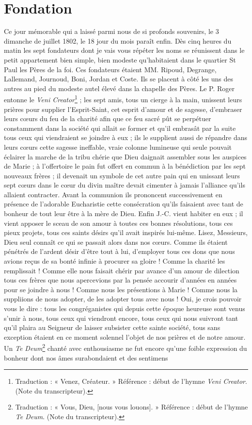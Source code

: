 \section*{Fondation}
Ce jour mémorable qui a laissé parmi nous de si profonds souvenirs, le 3 dimanche de juillet 1802, le 18 jour du mois paraît enfin. Dès cinq heures du matin les sept fondateurs dont je vais vous répéter les noms se réunissent dans le petit appartement bien simple, bien modeste qu'habitaient dans le quartier St Paul les Pères de la foi. Ces fondateurs étaient MM. Ripoud, Degrange, Lallemand, Journoud, Boni, Jordan et Coste. Ils se placent à côté les uns des autres au pied du modeste autel élevé dans la chapelle des Pères. Le P. Roger entonne le \textit{Veni Creator}\footnote{Traduction : « Venez, Créateur. » Référence : début de l’hymne \textit{Veni Creator}. (Note du transcripteur).} ; les sept amis, tous un cierge à la main, unissent leurs prières pour supplier l'Esprit-Saint, cet esprit d'amour et de sagesse, d'embraser leurs cœurs du feu de la charité afin que ce feu sacré pût se perpétuer constamment dans la société qui allait se former et qu'il embrasât par la suite tous ceux qui viendraient se joindre à eux ; ils le supplient aussi de répandre dans leurs cœurs cette sagesse ineffable, vraie colonne lumineuse qui seule pouvait éclairer la marche de la tribu chérie que Dieu daignait assembler sous les auspices de Marie ; à l'offertoire le pain fut offert en commun à la bénédiction par les sept nouveaux frères ; il devenait un symbole de cet autre pain qui en unissant
leurs sept cœurs dans le cœur du divin maître devait cimenter à jamais l'alliance qu'ils allaient contracter. Avant la communion ils prononcent successivement en présence de l'adorable Eucharistie cette consécration qu'ils faisaient avec tant de bonheur de tout leur être à la mère de Dieu. Enfin J.-C. vient habiter en eux ; il vient apposer le sceau de son amour à toutes ces bonnes résolutions, tous ces pieux projets, tous ces saints désirs qu'il avait inspirés lui-même. Lisez, Messieurs, Dieu seul connaît ce qui se passait alors dans nos cœurs. Comme ils étaient pénétrés de l'ardent désir d'être tout à lui, d'employer tous ces dons que nous avions reçus de sa bonté infinie à procurer sa gloire ! Comme la charité les remplissait ! Comme elle nous faisait chérir par avance d'un amour de dilection tous ces frères que nous apercevions par la pensée accourir d'années en années pour se joindre à nous ! Comme nous les présentions à Marie ! Comme nous la suppliions de nous adopter, de les adopter tous avec nous ! Oui, je crois pouvoir vous le dire : tous les congréganistes qui depuis cette époque heureuse sont venus s'unir à nous, tous ceux qui viendront encore, tous ceux qui nous suivront tant qu'il plaira au Seigneur de laisser subsister cette sainte société, tous sans exception étaient en ce moment solennel l'objet de nos prières et de notre amour. Un \textit{Te Deum}\footnote{Traduction : « Vous, Dieu, [nous vous louons]. » Référence : début de l’hymne \textit{Te Deum}. (Note du transcripteur).} chanté avec enthousiasme ne fut encore qu'une foible expression du bonheur dont nos âmes surabondaient et des sentimens
